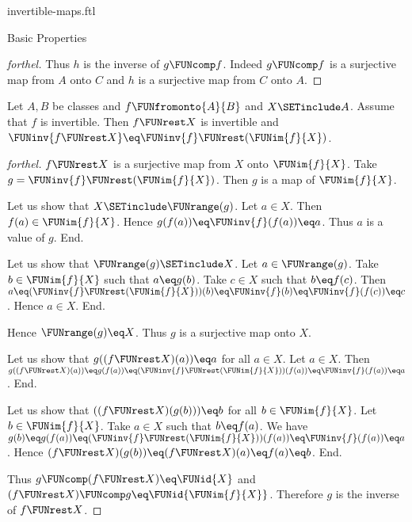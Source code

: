 \documentclass{naproche-library}
\begin{document}
\begin{smodule}[title=Invertible Maps]{invertible-maps.ftl}
\begin{sfragment}{Basic Properties}
\begin{proof}[forthel]
    Thus $h$ is the inverse of $g \FUNcomp f$.
    Indeed $g \FUNcomp f$ is a surjective map from $A$ onto $C$ and $h$ is a surjective map from $C$ onto $A$.
  \end{proof}

  \begin{proposition}[forthel,id=FOUNDATIONS_09_6374884963778560]
    Let $A, B$ be classes and $f \FUNfromonto{A}{B}$ and $X \SETinclude A$.
    Assume that $f$ is invertible.
    Then $f \FUNrest X$ is invertible and $\FUNinv{f\FUNrest X} \eq \FUNinv{f} \FUNrest (\FUNim{f}{X})$.
  \end{proposition}
  \begin{proof}[forthel]
    $f \FUNrest X$ is a surjective map from $X$ onto $\FUNim{f}{X}$.
    Take $g = \FUNinv{f} \FUNrest (\FUNim{f}{X})$.
    Then $g$ is a map of $\FUNim{f}{X}$.

    Let us show that $X \SETinclude \FUNrange(g)$.
      Let $a \in X$.
      Then $f(a) \in \FUNim{f}{X}$.
      Hence $g(f(a)) \eq \FUNinv{f}(f(a)) \eq a$.
      Thus $a$ is a value of $g$.
    End.

    Let us show that $\FUNrange(g) \SETinclude X$.
      Let $a \in \FUNrange(g)$.
      Take $b \in \FUNim{f}{X}$ such that $a \eq g(b)$.
      Take $c \in X$ such that $b \eq f(c)$.
      Then $a
        \eq (\FUNinv{f} \FUNrest (\FUNim{f}{X}))(b)
        \eq \FUNinv{f}(b)
        \eq \FUNinv{f}(f(c))
        \eq c$.
      Hence $a \in X$.
    End.

    Hence $\FUNrange(g) \eq X$.
    Thus $g$ is a surjective map onto $X$.

    Let us show that $g((f \FUNrest X)(a)) \eq a$ for all $a \in X$.
      Let $a \in X$.
      Then $g((f \FUNrest X)(a))
        \eq g(f(a))
        \eq (\FUNinv{f} \FUNrest (\FUNim{f}{X}))(f(a))
        \eq \FUNinv{f}(f(a))
        \eq a$.
    End.

    Let us show that $((f \FUNrest X)(g(b))) \eq b$ for all $b \in \FUNim{f}{X}$.
      Let $b \in \FUNim{f}{X}$.
      Take $a \in X$ such that $b \eq f(a)$.
      We have $g(b)
        \eq g(f(a))
        \eq (\FUNinv{f} \FUNrest (\FUNim{f}{X}))(f(a))
        \eq \FUNinv{f}(f(a))
        \eq a$.
      Hence $(f \FUNrest X)(g(b))
        \eq (f \FUNrest X)(a)
        \eq f(a)
        \eq b$.
    End.

    Thus $g \FUNcomp (f \FUNrest X) \eq \FUNid{X}$ and $(f \FUNrest X) \FUNcomp g \eq \FUNid{\FUNim{f}{X}}$.
    Therefore $g$ is the inverse of $f \FUNrest X$.
  \end{proof}


\end{sfragment}
\end{smodule}
\end{document}
